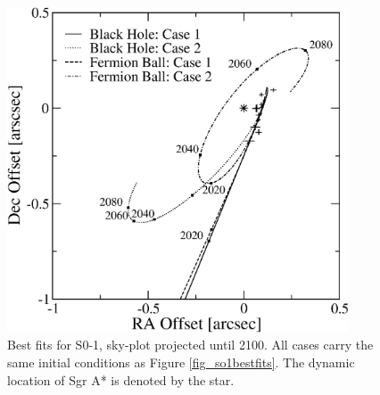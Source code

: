 \begin{figure}[!p]
	\begin{center}
	\includegraphics[width=0.9\textwidth]{eps/skyplot-so1.eps}
	\caption{Best fits for S0-1, sky-plot projected until 2100. All cases carry the same initial conditions as
	Figure \ref{fig_so1bestfits}. The dynamic location of Sgr A* is denoted by the star.}
	\label{fig_so1bestfitssky}
	\end{center}
\end{figure}
